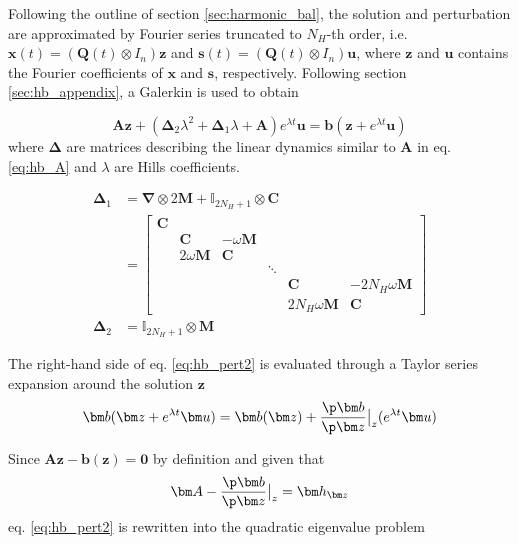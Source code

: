 Following the outline of section \ref{sec:harmonic_bal}, the solution and
perturbation are approximated by Fourier series truncated to $N_H$-th order,
i.e. $\bm x(t) = (\bm Q(t) \otimes I_n)\bm z$ and $\bm s(t) = (\bm Q(t) \otimes
I_n)\bm u$, where $\bm z$ and $\bm u$ contains the Fourier coefficients of $\bm
x$ and $\bm s$, respectively. Following section \ref{sec:hb_appendix}, a
Galerkin is used to obtain

\begin{equation}
  \bm A \bm z +
  (\bm \Delta_2\lambda^2 + \bm \Delta_1 \lambda + \bm A) e^{\lambda t} \bm u =
  \bm b(\bm z + e^{\lambda t} \bm u)
  \label{eq:hb_pert2}
\end{equation}
where $\bm \Delta$ are matrices describing the linear dynamics similar to $\bm
A$ in eq. \eqref{eq:hb_A} and $\lambda$ are Hills coefficients.

\begin{equation}
  \begin{aligned}
    \bm \Delta_1 &= \bm \nabla \otimes 2\bm M + \mathbb{I}_{2N_H+1} \otimes \bm C \\
    &=
    \begin{bmatrix}
      \bm C \\
      & \bm C & -\omega \bm M \\
      & 2\omega \bm M & \bm C \\
      & & & \ddots \\
      & & & & \bm C & -2N_H \omega \bm M \\
      & & & & 2N_H \omega \bm M & \bm C
    \end{bmatrix} \\
    \bm \Delta_2 &= \mathbb{I}_{2N_H+1} \otimes \bm M
  \end{aligned}
\end{equation}

The right-hand side of eq. \eqref{eq:hb_pert2} is evaluated through a Taylor series expansion around
the solution $\bm z$
\begin{equation}
  \bm b(\bm z+e^{\lambda t} \bm u) = \bm b(\bm z) + \frac{\p \bm b}{\p \bm z}\big|_z (e^{\lambda t}\bm u)
\end{equation}

Since $\bm A \bm z - \bm b(\bm z) = \bm 0$ by definition and given that
\begin{equation}
  \bm A - \frac{\p \bm b}{\p \bm z}\big|_z = \bm h_{\bm z}
\end{equation}
eq. \eqref{eq:hb_pert2} is rewritten into the quadratic eigenvalue problem

